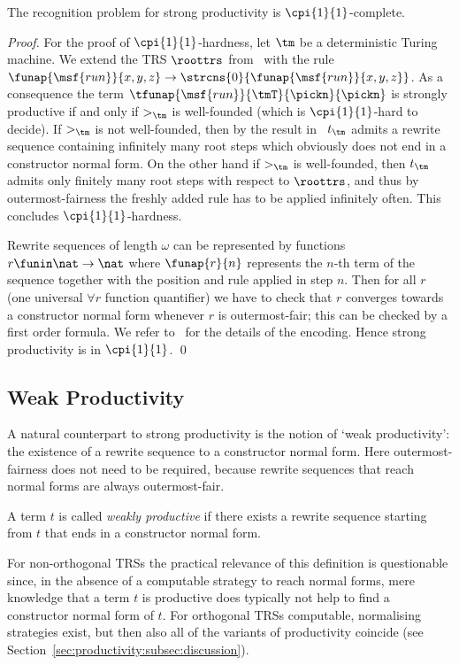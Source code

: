 \begin{theorem}\label{thm:omfair}
  The recognition problem for strong productivity is $\cpi{1}{1}$-complete.
\end{theorem}
\begin{proof}
  For the proof of $\cpi{1}{1}$-hardness, let $\tm$ be a deterministic
  Turing machine.
  We extend the TRS $\roottrs$ from~\cite{endr:geuv:zant:2009}
  with the rule $\funap{\msf{run}}{x,y,z} \to \strcns{0}{\funap{\msf{run}}{x,y,z}}$.
  As a consequence the term $\tfunap{\msf{run}}{\tmT}{\pickn}{\pickn}$ is strongly productive
  if and only if ${>_\tm}$ is well-founded (which is $\cpi{1}{1}$-hard to decide).
  If $>_\tm$ is not well-founded, then by the result in~\cite{endr:geuv:zant:2009}
  $t_\tm$ admits a rewrite sequence containing infinitely many root steps which obviously does not end in a constructor normal form.
  On the other hand if $>_\tm$ is well-founded, then $t_\tm$ admits only finitely many root steps with respect to $\roottrs$,
  and thus by outermost-fairness the freshly added rule has to be applied infinitely often.
  This concludes $\cpi{1}{1}$-hardness.

  Rewrite sequences of length $\omega$ can be represented by functions $r \funin \nat \to \nat$
  where $\funap{r}{n}$ represents the $n$-th term of the sequence together with the position and rule
  applied in step $n$. 
  Then for all $r$ (one universal $\forall r$ function quantifier) we have to check
  that $r$ converges towards a constructor normal form whenever $r$ is outermost-fair;
  this can be checked by a first order formula.
  We refer to~\cite{endr:geuv:zant:2009} for the details of the encoding.
  Hence strong productivity is in $\cpi{1}{1}$.
  \qed
\end{proof}

\subsection{Weak Productivity}\label{sec:productivity:subsec:weak}

A natural counterpart to strong productivity is the notion of `weak productivity':
the existence of a rewrite sequence to a constructor normal form.
Here outermost-fairness does not need to be required, 
because rewrite sequences that reach normal forms
are always outermost-fair. 


\begin{definition}\normalfont\label{def:weakproductivity}
A term $t$ is called \emph{weakly productive}
  if there exists a rewrite sequence starting from $t$ that ends in a constructor normal form.
\end{definition}
For non-orthogonal TRSs the practical relevance of this definition is questionable
since, in the absence of a computable strategy to reach normal forms,
mere knowledge that a term $t$ is productive does typically not help
to find a constructor normal form of $t$. 
For orthogonal TRSs computable, normalising strategies exist,
but then also all of the variants of productivity coincide
(see Section~\ref{sec:productivity:subsec:discussion}).

